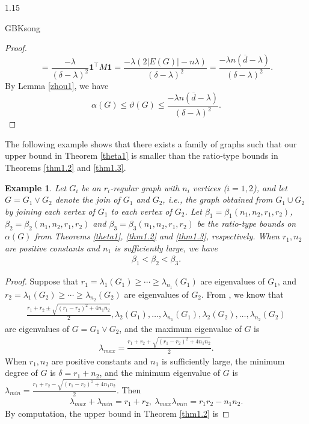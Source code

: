 \documentclass[preprint,12pt]{elsarticle}
\newtheorem{example}[thm]{Example}
\begin{document}
\begin{spacing}{1.15}
\begin{CJK*}{GBK}{song}
\begin{proof}
$$=\frac{-\lambda}{(\delta-\lambda)^2}  {\mathbf{1}^\top M{\mathbf{1}}}=\frac{-\lambda(2|E(G)|-n\lambda)}{(\delta-\lambda)^2}=\frac{-\lambda n(\overline{d} - \lambda)}{(\delta - \lambda)^{2}}.$$
By Lemma \ref{zhou1}, we have
$$\alpha(G) \leq \vartheta(G) \leq \frac{-\lambda n(\overline{d} - \lambda)}{(\delta - \lambda)^{2}}.$$
\end{proof}
The following example shows that there exists a family of graphs such that our upper bound in Theorem \ref{theta1} is smaller than the ratio-type bounds in Theorems \ref{thm1.2} and \ref{thm1.3}.
\begin{example}
Let $G_i$ be an $r_i$-regular graph with $n_i$ vertices ($i=1,2$), and let $G=G_1\vee G_2$ denote the join of $G_1$ and $G_2$, i.e., the graph obtained from $G_1\cup G_2$ by joining each vertex of $G_1$ to each vertex of $G_2$. Let $\beta_1=\beta_1(n_1,n_2,r_1,r_2)$, $\beta_2=\beta_2(n_1,n_2,r_1,r_2)$ and $\beta_3=\beta_3(n_1,n_2,r_1,r_2)$ be the ratio-type bounds on $\alpha(G)$ from Theorems \ref{theta1}, \ref{thm1.2} and \ref{thm1.3}, respectively. When $r_1,n_2$ are positive constants and $n_1$ is sufficiently large, we have
\begin{eqnarray*}
\beta_1<\beta_2<\beta_3.
\end{eqnarray*}
\end{example}
\begin{proof}
Suppose that $r_1=\lambda_1(G_1)\geq\cdots\geq\lambda_{n_1}(G_1)$ are eigenvalues of $G_1$, and $r_2=\lambda_1(G_2)\geq\cdots\geq\lambda_{n_2}(G_2)$ are eigenvalues of $G_2$. From \cite[Theorem 2.1.8]{Cvetkovic1}, we know that
\begin{eqnarray*}
\frac{r_1+r_2\pm\sqrt{(r_1-r_2)^2+4n_1n_2}}{2},\lambda_2(G_1),\ldots,\lambda_{n_1}(G_1),\lambda_2(G_2),\ldots,\lambda_{n_2}(G_2)
\end{eqnarray*}
are eigenvalues of $G=G_1\vee G_2$, and the maximum eigenvalue of $G$ is
\begin{eqnarray*}
\lambda_{max}=\frac{r_1+r_2+\sqrt{(r_1-r_2)^2+4n_1n_2}}{2}.
\end{eqnarray*}
When $r_1,n_2$ are positive constants and $n_1$ is sufficiently large, the minimum degree of $G$ is $\delta=r_1+n_2$, and the minimum eigenvalue of $G$ is $\lambda_{min}=\frac{r_1+r_2-\sqrt{(r_1-r_2)^2+4n_1n_2}}{2}$. Then
\begin{eqnarray*}
\lambda_{max}+\lambda_{min}=r_1+r_2,~\lambda_{max}\lambda_{min}=r_1r_2-n_1n_2.
\end{eqnarray*}
By computation, the upper bound in Theorem \ref{thm1.2} is

\end{proof}
\end{CJK*}
\end{spacing}
\end{document}

